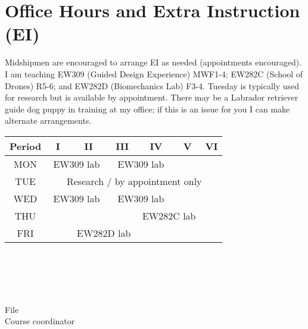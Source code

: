 \documentclass[11pt,courier]{navymemo}
\begin{document}
\section{Office Hours and Extra Instruction (EI)} Midshipmen are encouraged to arrange EI as needed (appointments encouraged). I am teaching EW309 (Guided Design Experience) MWF1-4; EW282C (School of Drones) R5-6; and EW282D (Biomechanics Lab) F3-4. Tuesday is typically used for research but is available by appointment. There may be a Labrador retriever guide dog puppy in training at my office; if this is an issue for you I can make alternate arrangements. 
\begin{table}[h]
\begin{center}
\begin{tabular}[h]{| c | c | c | c | c | c | c |}
\hline
\bf Period & \bf I & \bf II & \bf III & \bf IV & \bf V & \bf VI\\
\hline
MON & \multicolumn{2}{c|}{\cellcolor{orange}EW309 lab} & \multicolumn{2}{c|}{\cellcolor{orange}EW309 lab} & &\\
\hline
TUE & \multicolumn{6}{c|}{\cellcolor{yellow}Research / by appointment only}\\
\hline
WED & \multicolumn{2}{c|}{\cellcolor{orange}EW309 lab} & \multicolumn{2}{c|}{\cellcolor{orange}EW309 lab} & &\\
\hline
THU & & & & \multicolumn{2}{c|}{\cellcolor{orange}EW282C lab} & \\
\hline
FRI & & \multicolumn{2}{c|}{\cellcolor{orange}EW282D lab} & & & \\
\hline
\end{tabular}
\end{center}
\end{table}

\noclosing{}\\
\noindent\hspace*{4in}
\signature{D Evangelista}

\noindent\hspace*{4in}{207 Maury Hall}\\
\hspace*{4in}{(410) 293-6132}\\

%


\copyto{}
File\\
Course coordinator
\end{document}
